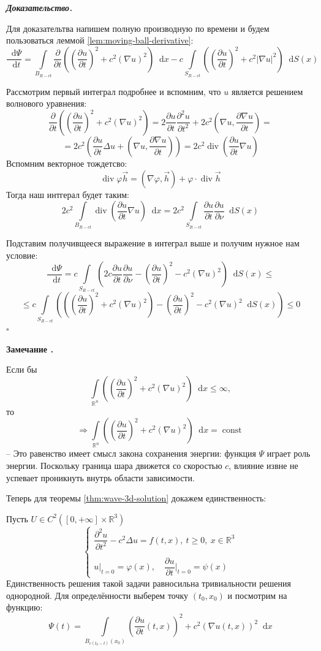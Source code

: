 \documentclass[11pt,a4paper]{report}
\numberwithin{equation}{section}
\numberwithin{figure}{chapter}
\numberwithin{table}{chapter}
\newif\ifinmathphysstatement
\newenvironment{myremark}[1][]{%
    \refstepcounter{remarkctr}%
    \inmathphysstatementtrue
    \begin{tcolorbox}[mathphysblock,colframe=remarkcolor,colback=remarkcolor!4,#1]
    \textbf{\color{remarkcolor}Замечание \theremarkctr.}\par\smallskip
}{%
    \end{tcolorbox}
    \inmathphysstatementfalse
}
\newenvironment{myproof}{%
    \begin{tcolorbox}[mathphysblock,colframe=proofcolor!65,colback=proofcolor!2,boxrule=0.5pt]
    \textit{\textbf{Доказательство.}}\par\smallskip
}{%
    \hfill$\square$
    \end{tcolorbox}
}
\newcommand{\R}{\mathbb{R}}
\newcommand{\p}{\partial}
\newcommand{\dd}{\mathop{}\!\mathrm{d}}
\newcommand{\skobka}[1]{\left( #1 \right)}
\begin{document}
\begin{myproof}
    Для доказательтва напишем полную производную по времени и будем пользоваться леммой \ref{lem:moving-ball-derivative}:
\[
\dfrac{\dd\Psi}{\dd t} = \int\limits_{B_{R-ct}}\dfrac{\p}{\p t}\skobka{\skobka{\dfrac{\p u}{\p t}}^2 + c^2\skobka{\nabla u}^2}\dd x - c\int\limits_{S_{R-ct}}\skobka{\skobka{\dfrac{\p u}{\p t}}^2 + c^2|\nabla u|^2}\dd S(x)
\]

Рассмотрим первый интеграл подробнее и вспомним, что $u$ является решением волнового уравнения:
\[
\dfrac{\p}{\p t}\skobka{\skobka{\dfrac{\p u}{\p t}}^2 + c^2\skobka{\nabla u}^2} = 2\dfrac{\p u}{\p t}\dfrac{\p^2 u}{\p t^2} + 2c^2\skobka{\nabla u,\dfrac{\p \nabla u}{\p t}} = \]\[=2c^2\skobka{\dfrac{\p u}{\p t}\Delta u + \skobka{\nabla u,\dfrac{\p \nabla u}{\p t}}} = 2c^2\operatorname{div}\skobka{\dfrac{\p u}{\p t}\nabla u}
\]
Вспомним векторное тождетсво:
\[\operatorname{div}\varphi \vec{h}=(\nabla \varphi,\vec{h})+\varphi \cdot \operatorname{div}\vec{h}\]
Тогда наш интгерал будет таким:
\[
2c^2\int\limits_{B_{R-ct}}\operatorname{div}\skobka{\dfrac{\p u}{\p t}\nabla u}\dd x = 2c^2\int\limits_{S_{R-ct}}\dfrac{\p u}{\p t}\dfrac{\p u}{\p \nu}\dd S(x)
\]

Подставим получивщееся выражение в интеграл выше и получим нужное нам условие:\[
\dfrac{\dd\Psi}{\dd t} = c\int\limits_{S_{R-ct}}\skobka{2c\dfrac{\p u}{\p t}\dfrac{\p u}{\p \nu} - \skobka{\dfrac{\p u}{\p t}}^2 - c^2\skobka{\nabla u}^2}\dd S(x)\leq \]\[
\leq c\int\limits_{S_{R-ct}}\skobka{\skobka{\skobka{\dfrac{\p u}{\p t}}^2 + c^2\skobka{\nabla u}^2} - \skobka{\dfrac{\p u}{\p t}}^2 - c^2\skobka{\nabla u}^2\dd S(x)}\leq0
\]
\end{myproof}

\begin{myremark}
    Если бы $$\int\limits_{\R^n}\skobka{\skobka{\dfrac{\p u}{\p t}}^2 + c^2\skobka{\nabla u}^2}\dd x \leq \infty, $$ то \[\Rightarrow \int\limits_{\R^n}\skobka{\skobka{\dfrac{\p u}{\p t}}^2 + c^2\skobka{\nabla u}^2}\dd x = \operatorname{const}\] --
     Это равенство имеет смысл закона сохранения энергии: функция $\Psi$ играет роль энергии. Поскольку граница шара движется со скоростью $c$, влияние извне не успевает проникнуть внутрь области зависимости.

\end{myremark}
Теперь для теоремы \ref{thm:wave-3d-solution} докажем единственность:

Пусть $U \in C^2([0,+\infty]\times\R^3) $
    \[
\begin{cases}
    \dfrac{\p^2 u}{\p t^2} - c^2\Delta u = f(t,x), \ t\geq0, \ x\in\R^3\\
    \\
    u\Big|_{t=0} = \varphi(x), \quad \dfrac{\p u}{\p t}\Big|_{t=0} = \psi(x)
\end{cases}
\]
Единственность решения такой задачи равносильна тривиальности решения однородной. 
Для определённости выберем  точку $(t_0,x_0)$ и посмотрим на  функцию:
\[
\Psi(t) = \int\limits_{B_{c(t_0 - t)}(x_0)}\skobka{\dfrac{\p u}{\p t}(t,x)}^2 + c^2\skobka{\nabla u(t,x)}^2\dd x
\]
\end{document}
